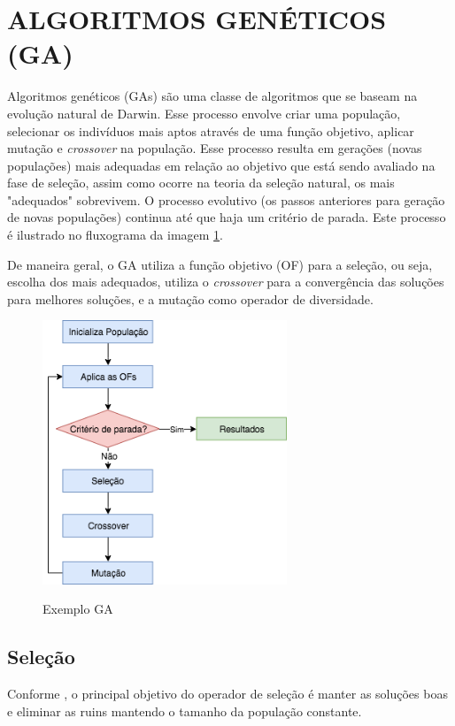 \section{ALGORITMOS GENÉTICOS (GA)}
Algoritmos genéticos (GAs) são uma classe de algoritmos que se baseam
na evolução natural de Darwin. Esse processo envolve criar uma população,
selecionar os indivíduos mais aptos através de uma função objetivo,
aplicar mutação e \textit{crossover} na população. 
Esse processo resulta em gerações (novas populações)
mais adequadas em relação ao objetivo que está sendo
avaliado na fase de seleção, assim como ocorre na teoria da 
seleção natural, os mais "adequados" sobrevivem. O processo evolutivo 
(os passos anteriores para geração de novas populações)
continua até que haja um critério de parada. Este processo é
ilustrado no fluxograma da imagem \ref{fig:gaalgorithm}.

De maneira geral, o GA utiliza a função objetivo (OF) para
a seleção, ou seja, escolha dos mais adequados, 
utiliza o \textit{crossover} para a convergência das soluções para melhores soluções,
e a mutação como operador de diversidade.

\begin{figure}[!htb]
  \centering
  \caption{Exemplo GA}
  \includegraphics[width=0.65\textwidth]{./dados/figuras/ga-algorithm.png}
  \label{fig:gaalgorithm}
\end{figure}

\subsection{Seleção}
Conforme \cite{ghosh}, o principal objetivo do operador de seleção é
manter as soluções boas e eliminar as ruins mantendo o tamanho da população
constante.

